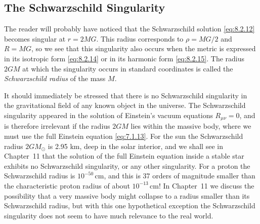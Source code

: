 
\subsection{The Schwarzschild Singularity\optionalreading}\label{sec:8.8}
\begingroup
\renewcommand{\thefootnote}{*}
\begin{NoHyper}
\end{NoHyper}
\endgroup

The reader will probably have noticed that the Schwarzschild solution
\eqref{eq:8.2.12} becomes singular at \(r=2MG\). This radius corresponds
to \(\rho=MG/2\) and \(R=MG\), so we see that this singularity also occurs
when the metric is expressed in its isotropic form \eqref{eq:8.2.14} or in
its harmonic form \eqref{eq:8.2.15}. The radius \(2GM\) at which the
singularity occurs in standard coordinates is called the
\emph{Schwarzschild radius} of the mass \(M\).

It should immediately be stressed that there is no Schwarzschild
singularity in the gravitational field of any known object in the universe.
The Schwarzschild singularity appeared in the solution of Einstein's vacuum
equations \(R_{\mu\nu}=0\), and is therefore irrelevant if the radius
\(2GM\) lies within the massive body, where we must use the full Einstein
equation \eqref{eq:7.1.13}. For the sun the Schwarzschild radius
\(2GM_\odot\) is 2.95 km, deep in the solar interior, and we shall see in
Chapter~11 that the solution of the full Einstein equation inside a stable
star exhibits no Schwarzschild singularity, or any other singularity. For
a proton the Schwarzschild radius is \(10^{-50}\,\mathrm{cm}\), and this is
37 orders of magnitude smaller than the characteristic proton radius of
about \(10^{-13}\,\mathrm{cm}\)! In Chapter~11 we discuss the possibility
that a very massive body might collapse to a radius smaller than its
Schwarzschild radius, but with this one hypothetical exception the
Schwarzschild singularity does not seem to have much relevance to the real
world.

